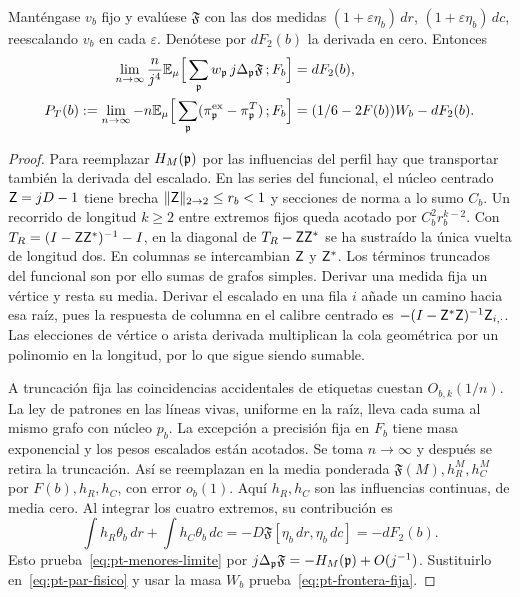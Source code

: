 \begin{proposicion}\label{prop:pt-corte}
Manténgase \(v_b\) fijo y evalúese \(\mathfrak F\) con las dos medidas
\((1+\varepsilon\eta_b)\,dr\), \((1+\varepsilon\eta_b)\,dc\), reescalando \(v_b\) en
cada \(\varepsilon\). Denótese por \(dF_2(b)\) la derivada en cero. Entonces
\begin{align}
 \lim_{n\to\infty}\frac n{j^4}\mathbb E_\mu
 \Big[\sum_{\mathfrak p} w_{\mathfrak p}\,j\Delta_{\mathfrak p}\mathfrak F\,;F_b\Big]&=dF_2(b),
 \label{eq:pt-menores-limite}\\
 P_T(b):=\lim_{n\to\infty}-n\mathbb E_\mu
 \Big[\sum_{\mathfrak p}(\pi_{\mathfrak p}^{\rm ex}-\pi_{\mathfrak p}^T)\,;F_b\Big]&=(1/6-2F(b))W_b-dF_2(b).
 \label{eq:pt-frontera-fija}
\end{align}
\end{proposicion}
\begin{proof}
Para reemplazar \(H_M(\mathfrak p)\) por las influencias del perfil hay que transportar también la
derivada del escalado. En las series del funcional, el núcleo centrado \(\mathsf Z=jD-1\) tiene
brecha \(\|\mathsf Z\|_{2\to2}\le r_b<1\) y secciones de norma a lo sumo \(C_b\). Un recorrido
de longitud \(k\ge2\) entre extremos fijos queda acotado por \(C_b^2r_b^{k-2}\).
Con \(T_R=(I-\mathsf Z\mathsf Z^*)^{-1}-I\), en la diagonal de \(T_R-\mathsf Z\mathsf Z^*\) se ha
 sustraído la única
vuelta de longitud dos. En columnas se intercambian \(\mathsf Z\) y \(\mathsf Z^*\).
Los términos truncados del funcional son por ello sumas de grafos simples.
Derivar una medida fija un vértice y resta su media. Derivar el escalado en una fila
\(i\) añade un camino hacia esa raíz, pues la respuesta de columna en el calibre centrado es
\(-(I-\mathsf Z^*\mathsf Z)^{-1}\mathsf Z_{i,\cdot}\). Las elecciones de vértice o arista derivada
 multiplican
la cola geométrica por un polinomio en la longitud, por lo que sigue siendo sumable.

A truncación fija las coincidencias accidentales de etiquetas cuestan \(O_{b,k}(1/n)\).
La ley de patrones en las líneas vivas, uniforme en la raíz, lleva cada suma al mismo grafo
con núcleo \(p_b\). La excepción a precisión fija en \(F_b\) tiene masa exponencial y los
pesos escalados están acotados. Se toma \(n\to\infty\) y después se retira la truncación.
Así se reemplazan en la media ponderada \(\mathfrak F(M),h_R^M,h_C^M\) por \(F(b),h_R,h_C\),
con error \(o_b(1)\). Aquí \(h_R,h_C\) son las influencias continuas, de media cero.
Al integrar los cuatro extremos, su contribución es
\[
 \int h_R\theta_b\,dr+\int h_C\theta_b\,dc
 =-D\mathfrak F[\eta_b\,dr,\eta_b\,dc]=-dF_2(b).
\]
Esto prueba~\eqref{eq:pt-menores-limite} por \(j\Delta_{\mathfrak p}\mathfrak F=-H_M(\mathfrak p)+O(j^{-1})\).
Sustituirlo en~\eqref{eq:pt-par-fisico} y usar la masa \(W_b\)
prueba~\eqref{eq:pt-frontera-fija}.
\end{proof}

